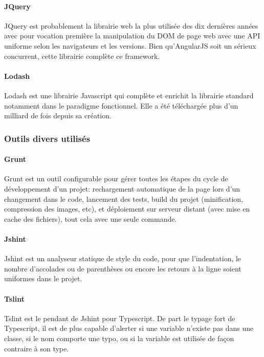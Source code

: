 \documentclass[a4paper,french,12pt]{article}
\begin{document}
		\paragraph{JQuery}
		JQuery est probablement la librairie web la plus utilisée des dix dernières années avec pour vocation première la manipulation du DOM de page web avec une API uniforme selon les navigateurs et les versions. Bien qu'AngularJS soit un sérieux concurrent, cette librairie complète ce framework.
		  	
		  \paragraph{Lodash}
		  Lodash est une librairie Javascript qui complète et enrichit la librairie standard notamment dans le paradigme fonctionnel.
		  Elle a été téléchargée plus d'un milliard de fois depuis sa création.
		  

		\subsubsection{Outils divers utilisés}
		  \paragraph{Grunt}
		  Grunt est un outil configurable pour gérer toutes les étapes du cycle de développement d'un projet: rechargement automatique de la page lors d'un changement dans le code, lancement des tests, build du projet (minification, compression des images, etc), et déploiement sur serveur distant (avec mise en cache des fichiers), tout cela avec une seule commande.
		  
		 \paragraph{Jshint}
		 Jshint est un analyseur statique de style du code, pour que l'indentation, le nombre d'accolades ou de parenthèses ou encore les retours à la ligne soient uniformes dans le projet.
		 
		\paragraph{Tslint}
		Tslint est le pendant de Jshint pour Typescript. De part le typage fort de Typescript, il est de plus capable d'alerter si une variable n'existe pas dans une classe, si le nom comporte une typo, ou si la variable est utilisée de façon contraire à son type.
		
\end{document}
